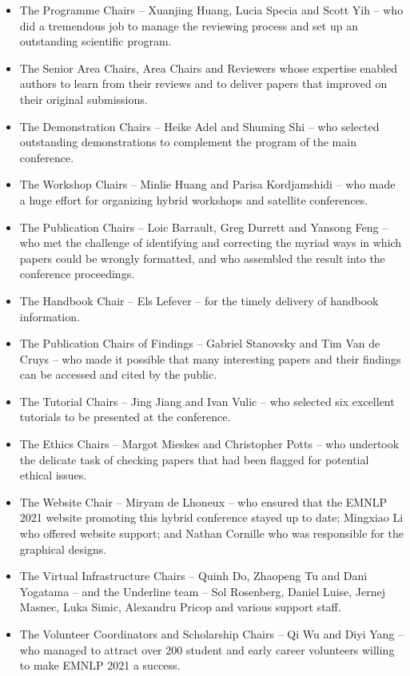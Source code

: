 \begin{itemize}

\item The Programme Chairs -- Xuanjing Huang, Lucia Specia and Scott Yih -- who did a tremendous job to manage the reviewing process and set up an outstanding scientific program.
\item The Senior Area Chairs, Area Chairs and Reviewers whose expertise enabled authors to learn from their reviews and to deliver papers that improved on their original submissions.
\item The Demonstration Chairs -- Heike Adel and Shuming Shi -- who selected outstanding demonstrations to complement the program of the main conference.
\item The Workshop Chairs -- Minlie Huang and Parisa Kordjamshidi -- who made a huge effort for organizing hybrid workshops and satellite conferences.
\item The Publication Chairs -- Loic Barrault, Greg Durrett and Yansong Feng -- who met the challenge of identifying and correcting the myriad ways in which papers could be wrongly formatted, and who assembled the result into the conference proceedings.
\item The Handbook Chair -- Els Lefever -- for the timely delivery of handbook information.
\newpage
\item The Publication Chairs of Findings -- Gabriel Stanovsky and Tim Van de Cruys -- who made it possible that many interesting papers and their findings can be accessed and cited by the public.
\item The Tutorial Chairs -- Jing Jiang and Ivan Vulic -- who selected six excellent tutorials to be presented at the conference.
\item The Ethics Chairs -- Margot Mieskes and Christopher Potts -- who undertook the delicate task of checking papers that had been flagged for potential ethical issues.
\item The Website Chair -- Miryam de Lhoneux -- who ensured that the EMNLP 2021 website promoting this hybrid conference stayed up to date; Mingxiao Li who offered website support; and Nathan Cornille who was responsible for the graphical designs.
\item The Virtual Infrastructure Chairs -- Quinh Do, Zhaopeng Tu and Dani Yogatama -- and the Underline team -- Sol Rosenberg, Daniel Luise, Jernej Masnec, Luka Simic, Alexandru Pricop and various support staff.
\item The Volunteer Coordinators and Scholarship Chairs -- Qi Wu and Diyi Yang -- who managed to attract over 200 student and early career volunteers willing to make EMNLP 2021 a success.

\end{itemize}
